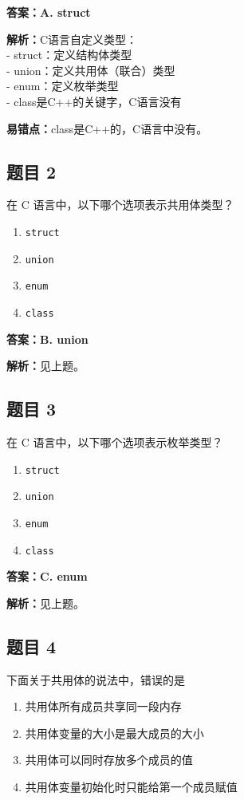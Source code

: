 \documentclass[12pt,a4paper]{ctexart}
\begin{document}
\begin{answerbox}
	\textbf{答案：A. struct}

	\textbf{解析：}C语言自定义类型：\\
	- struct：定义结构体类型\\
	- union：定义共用体（联合）类型\\
	- enum：定义枚举类型\\
	- class是C++的关键字，C语言没有

	\textbf{易错点：}class是C++的，C语言中没有。
\end{answerbox}

\subsection*{题目 2}
在 C 语言中，以下哪个选项表示共用体类型？
\begin{enumerate}[label=\Alph*.]
	\item \texttt{struct}
	\item \texttt{union}
	\item \texttt{enum}
	\item \texttt{class}
\end{enumerate}

\begin{answerbox}
	\textbf{答案：B. union}

	\textbf{解析：}见上题。
\end{answerbox}

\subsection*{题目 3}
在 C 语言中，以下哪个选项表示枚举类型？
\begin{enumerate}[label=\Alph*.]
	\item \texttt{struct}
	\item \texttt{union}
	\item \texttt{enum}
	\item \texttt{class}
\end{enumerate}

\begin{answerbox}
	\textbf{答案：C. enum}

	\textbf{解析：}见上题。
\end{answerbox}

\subsection*{题目 4}
下面关于共用体的说法中，错误的是
\begin{enumerate}[label=\Alph*.]
	\item 共用体所有成员共享同一段内存
	\item 共用体变量的大小是最大成员的大小
	\item 共用体可以同时存放多个成员的值
	\item 共用体变量初始化时只能给第一个成员赋值
\end{enumerate}
\end{document}
